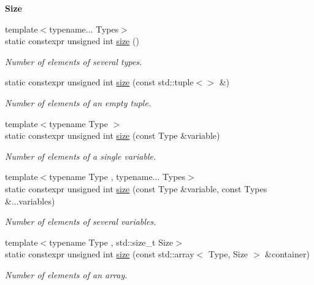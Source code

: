 \begin{Indent}{\bf Size}\par
\begin{DoxyCompactItemize}
\item 
{\footnotesize template$<$typename... Types$>$ }\\static constexpr unsigned int \hyperlink{exceptionmagrathea_1_1DataHandler_ac4e7131096c0eeb8f86b6d017ed1edb2}{size} ()
\begin{DoxyCompactList}\small\item\em Number of elements of several types. \end{DoxyCompactList}\item 
static constexpr unsigned int \hyperlink{exceptionmagrathea_1_1DataHandler_a46e1fde9798b019bc5b033e2e17fa7db}{size} (const std\-::tuple$<$$>$ \&)
\begin{DoxyCompactList}\small\item\em Number of elements of an empty tuple. \end{DoxyCompactList}\item 
{\footnotesize template$<$typename Type $>$ }\\static constexpr unsigned int \hyperlink{exceptionmagrathea_1_1DataHandler_af8c18351676d2ac685b22524986bba92}{size} (const Type \&variable)
\begin{DoxyCompactList}\small\item\em Number of elements of a single variable. \end{DoxyCompactList}\item 
{\footnotesize template$<$typename Type , typename... Types$>$ }\\static constexpr unsigned int \hyperlink{exceptionmagrathea_1_1DataHandler_a729d47a64d97ca03141eed087a0568d1}{size} (const Type \&variable, const Types \&...variables)
\begin{DoxyCompactList}\small\item\em Number of elements of several variables. \end{DoxyCompactList}\item 
{\footnotesize template$<$typename Type , std\-::size\-\_\-t Size$>$ }\\static constexpr unsigned int \hyperlink{exceptionmagrathea_1_1DataHandler_aeb6e50e89fe939e797450f8428dc40dc}{size} (const std\-::array$<$ Type, Size $>$ \&container)
\begin{DoxyCompactList}\small\item\em Number of elements of an array. \end{DoxyCompactList}\item 
$$
\end{DoxyCompactItemize}
\end{Indent}
